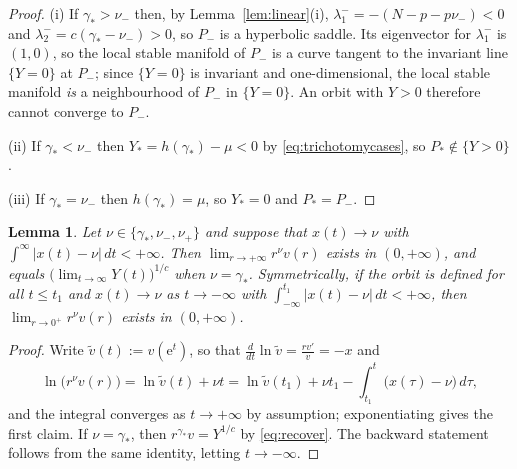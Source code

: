 \documentclass[11pt,reqno]{amsart}
\numberwithin{equation}{section}
\theoremstyle{plain}
\newtheorem{lemma}[theorem]{Lemma}
\theoremstyle{definition}
\newcommand{\gs}{\gamma_{*}}
\begin{document}
\begin{proof}
(i) If $\gs>\nu_{-}$ then, by Lemma~\ref{lem:linear}(i),
$\lambda_{1}^{-}=-(N-p-p\nu_{-})<0$ and $\lambda_{2}^{-}=c(\gs-\nu_{-})>0$, so
$P_{-}$ is a hyperbolic saddle. Its eigenvector for $\lambda_{1}^{-}$ is
$(1,0)$, so the local stable manifold of $P_{-}$ is a curve tangent to the
invariant line $\{Y=0\}$ at $P_{-}$; since $\{Y=0\}$ is invariant and
one-dimensional, the local stable manifold \emph{is} a neighbourhood of
$P_{-}$ in $\{Y=0\}$. An orbit with $Y>0$ therefore cannot converge to
$P_{-}$.

(ii) If $\gs<\nu_{-}$ then $Y_{*}=h(\gs)-\mu<0$ by
\eqref{eq:trichotomycases}, so $P_{*}\notin\{Y>0\}$.

(iii) If $\gs=\nu_{-}$ then $h(\gs)=\mu$, so $Y_{*}=0$ and $P_{*}=P_{-}$.
\end{proof}

\begin{lemma}\label{lem:rate}
Let $\nu\in\{\gs,\nu_{-},\nu_{+}\}$ and suppose that $x(t)\to\nu$ with
$\int^{\infty}|x(t)-\nu|\,dt<+\infty$. Then
$\lim_{r\to+\infty}r^{\nu}v(r)$ exists in $(0,+\infty)$, and equals
$\big(\lim_{t\to\infty}Y(t)\big)^{1/c}$ when $\nu=\gs$. Symmetrically, if the
orbit is defined for all $t\le t_{1}$ and $x(t)\to\nu$ as $t\to-\infty$ with
$\int_{-\infty}^{t_{1}}|x(t)-\nu|\,dt<+\infty$, then
$\lim_{r\to0^{+}}r^{\nu}v(r)$ exists in $(0,+\infty)$.
\end{lemma}

\begin{proof}
Write $\tilde v(t):=v(\mathrm e^{t})$, so that
$\frac{d}{dt}\ln\tilde v=\frac{rv'}{v}=-x$ and
\[
\ln\big(r^{\nu}v(r)\big)=\ln\tilde v(t)+\nu t
=\ln\tilde v(t_{1})+\nu t_{1}-\int_{t_{1}}^{t}\big(x(\tau)-\nu\big)\,d\tau ,
\]
and the integral converges as $t\to+\infty$ by assumption; exponentiating gives
the first claim. If $\nu=\gs$, then $r^{\gs}v=Y^{1/c}$ by \eqref{eq:recover}.
The backward statement follows from the same identity, letting $t\to-\infty$.
\end{proof}
\end{document}
